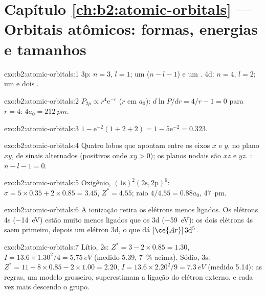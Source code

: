 \section*{Capítulo \ref{ch:b2:atomic-orbitals} --- Orbitais atômicos: formas, energias e tamanhos}

\begin{solution}{exo:b2:atomic-orbitals:1}
3p: $n = 3$, $l = 1$; um  ($n - l - 1$) e um . 4d: $n = 4$,
$l = 2$; um  e dois .
\end{solution}

\begin{solution}{exo:b2:atomic-orbitals:2}
$P_{2p} \propto r^4\mathrm e^{-r}$ ($r$ em $a_0$): $d\ln P/dr = 4/r - 1 = 0$ para $r = 4$:
$4a_0 = \qty{212}{pm}$.
\end{solution}

\begin{solution}{exo:b2:atomic-orbitals:3}
$1 - \mathrm e^{-2}(1 + 2 + 2) = 1 - 5\mathrm e^{-2} = 0.323$.
\end{solution}

\begin{solution}{exo:b2:atomic-orbitals:4}
Quatro lobos que apontam entre os eixos $x$ e $y$, no plano $xy$, de sinais
alternados (positivos onde $xy > 0$); os planos nodais são $xz$ e $yz$. : $n - l - 1 = 0$.
\end{solution}

\begin{solution}{exo:b2:atomic-orbitals:5}
Oxigênio, $(1\mathrm s)^2(2\mathrm s, 2\mathrm p)^6$: $\sigma = 5 \times 0.35 + 2 \times 0.85
= 3.45$, $Z^* = 4.55$; raio $4/4.55 = 0.88a_0$, \qty{47}{pm}.
\end{solution}

\begin{solution}{exo:b2:atomic-orbitals:6}
A ionização retira os elétrons menos ligados. Os elétrons 4s
(\qty{-14}{eV}) estão muito menos ligados que os 3d (\qty{-59}{eV}): os dois
elétrons 4s saem primeiro, depois um elétron 3d, o que dá $[\ce{Ar}]\,3\mathrm d^5$.
\end{solution}

\begin{solution}{exo:b2:atomic-orbitals:7}
Lítio, 2s: $Z^* = 3 - 2 \times 0.85 = 1.30$, $I = 13.6 \times 1.30^2/4 =
\qty{5.75}{eV}$ (medido 5.39, 7~\% acima). Sódio, 3s: $Z^* = 11 - 8 \times 0.85 -
2 \times 1.00 = 2.20$, $I = 13.6 \times 2.20^2/9 = \qty{7.3}{eV}$ (medido 5.14): as
regras, um modelo grosseiro, superestimam a ligação do elétron externo, e
cada vez mais descendo o grupo.
\end{solution}

